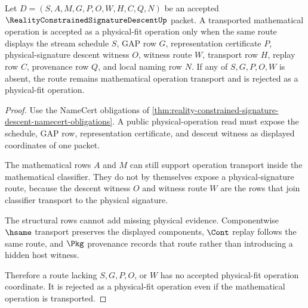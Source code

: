 \begin{theorem}
\label{thm:reality-constrained-signature-descent-no-free-operation}
Let $D=(S,A,M,G,P,O,W,H,C,Q,N)$ be an accepted $\RealityConstrainedSignatureDescentUp$ packet. A transported mathematical operation is accepted as a physical-fit operation only when the same route displays the stream schedule $S$, GAP row $G$, representation certificate $P$, physical-signature descent witness $O$, witness route $W$, transport row $H$, replay row $C$, provenance row $Q$, and local naming row $N$. If any of $S,G,P,O,W$ is absent, the route remains mathematical operation transport and is rejected as a physical-fit operation.
\end{theorem}
\begin{proof}
Use the NameCert obligations of \autoref{thm:reality-constrained-signature-descent-namecert-obligations}. A public physical-operation read must expose the schedule, GAP row, representation certificate, and descent witness as displayed coordinates of one packet.

The mathematical rows $A$ and $M$ can still support operation transport inside the mathematical classifier. They do not by themselves expose a physical-signature route, because the descent witness $O$ and witness route $W$ are the rows that join classifier transport to the physical signature.

The structural rows cannot add missing physical evidence. Componentwise $\hsame$ transport preserves the displayed components, $\Cont$ replay follows the same route, and $\Pkg$ provenance records that route rather than introducing a hidden host witness.

Therefore a route lacking $S,G,P,O$, or $W$ has no accepted physical-fit operation coordinate. It is rejected as a physical-fit operation even if the mathematical operation is transported.
\end{proof}



